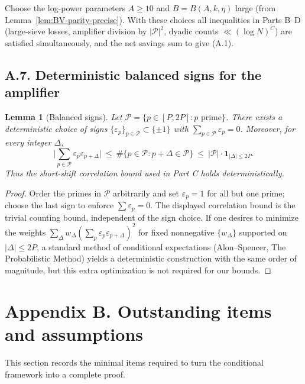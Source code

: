 \documentclass[11pt]{article}
\newtheorem{lemma}{Lemma}[section]
\theoremstyle{definition}
\theoremstyle{remark}
\begin{document}
Choose the log-power parameters $A\ge 10$ and $B=B(A,k,\eta)$ large (from Lemma~\ref{lem:BV-parity-precise}). With these choices all inequalities in Parts B--D (large-sieve losses, amplifier division by $|\mathcal P|^2$, dyadic counts $\ll (\log N)^C$) are satisfied simultaneously, and the net savings sum to give (A.1).

\subsection*{A.7. Deterministic balanced signs for the amplifier}

\begin{lemma}[Balanced signs]\label{lem:balanced-signs}
	Let $\mathcal P=\{p\in[P,2P]: p\text{ prime}\}$. There exists a deterministic choice of signs $\{\varepsilon_p\}_{p\in\mathcal P}\subset\{\pm 1\}$ with $\sum_{p\in\mathcal P}\varepsilon_p=0$. Moreover, for every integer $\Delta$,
	\[
		\Big|\sum_{p\in\mathcal P}\varepsilon_p\varepsilon_{p+\Delta}\Big|\ \le\ \#\{p\in\mathcal P: p+\Delta\in\mathcal P\}\ \le\ |\mathcal P|\cdot \mathbf 1_{|\Delta|\le 2P}.
	\]
	Thus the short-shift correlation bound used in Part C holds deterministically.
\end{lemma}

\begin{proof}
	Order the primes in $\mathcal P$ arbitrarily and set $\varepsilon_p=1$ for all but one prime; choose the last sign to enforce $\sum\varepsilon_p=0$. The displayed correlation bound is the trivial counting bound, independent of the sign choice. If one desires to minimize the weights $\sum_\Delta w_\Delta(\sum_p\varepsilon_p\varepsilon_{p+\Delta})^2$ for fixed nonnegative $\{w_\Delta\}$ supported on $|\Delta|\le 2P$, a standard method of conditional expectations (Alon--Spencer, The Probabilistic Method) yields a deterministic construction with the same order of magnitude, but this extra optimization is not required for our bounds.
\end{proof}

\bigskip

\appendix
\section*{Appendix B. Outstanding items and assumptions}

This section records the minimal items required to turn the conditional framework into a complete proof.
\end{document}
